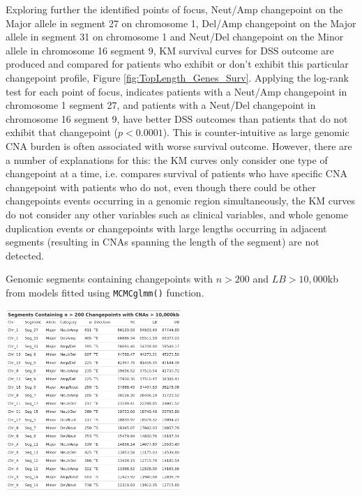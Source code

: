 Exploring further the identified points of focus, Neut/Amp changepoint on the Major allele in segment 27 on chromosome 1, Del/Amp changepoint on the Major allele in segment 31 on chromosome 1 and Neut/Del changepoint on the Minor allele in chromosome 16 segment 9, KM survival curves for DSS outcome are produced and compared for patients who exhibit or don't exhibit this particular changepoint profile, Figure \ref{fig:TopLength_Genes_Surv}. Applying the log-rank test for each point of focus, indicates patients with a Neut/Amp changepoint in chromosome 1 segment 27, and patients with a Neut/Del changepoint in chromosome 16 segment 9, have better DSS outcomes than patients that do not exhibit that changepoint ($p < 0.0001$).  This is counter-intuitive as large genomic CNA burden is often associated with worse survival outcome. However, there are a number of explanations for this: the KM curves only consider one type of changepoint at a time, i.e. compares survival of patients who have specific CNA changepoint with patients who do not, even though there could be other changepoints events occurring in a genomic region simultaneously, the KM curves do not consider any other variables such as clinical variables, and whole genome duplication events or changepoints with large lengths occurring in adjacent segments (resulting in CNAs spanning the length of the segment) are not detected.

\vfill
\begin{table}[!htb]
\caption[Genomic segments containing changepoints with $n > 200$ and $LB > 10,000$kb from  models fitted using \texttt{MCMCglmm()} function.]{Genomic segments containing changepoints with $n > 200$ and $LB > 10,000$kb from  models fitted using \texttt{MCMCglmm()} function.}

\centering
\includegraphics[width = 0.5\textwidth]{../tables/Chapter_6/Segment_MCMC_10000_Five_Thesis.png}
\label{tab:TopLength_Seg_1}
\end{table}
\vfill 

